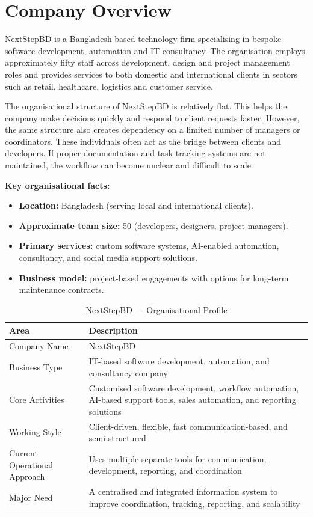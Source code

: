 \documentclass[12pt,a4paper]{report}
\begin{document}
\section{Company Overview}
NextStepBD is a Bangladesh-based technology firm specialising in bespoke software development, automation and IT consultancy. The organisation employs approximately fifty staff across development, design and project management roles and provides services to both domestic and international clients in sectors such as retail, healthcare, logistics and customer service.

The organisational structure of NextStepBD is relatively flat. This helps the company make decisions quickly and respond to client requests faster. However, the same structure also creates dependency on a limited number of managers or coordinators. These individuals often act as the bridge between clients and developers. If proper documentation and task tracking systems are not maintained, the workflow can become unclear and difficult to scale.

\textbf{Key organisational facts:}

\begin{itemize}[leftmargin=2em]
    \item \textbf{Location:} Bangladesh (serving local and international clients).
    \item \textbf{Approximate team size:} 50 (developers, designers, project managers).
    \item \textbf{Primary services:} custom software systems, AI-enabled automation, consultancy, and social media support solutions.
    \item \textbf{Business model:} project-based engagements with options for long-term maintenance contracts.
\end{itemize}

\begin{table}[H]
\centering
\renewcommand{\arraystretch}{1.3}
\begin{tabularx}{\textwidth}{|p{4cm}|X|}
\hline
\rowcolor{secondary}
\textbf{Area} & \textbf{Description} \\
\hline
Company Name & NextStepBD \\
\hline
Business Type & IT-based software development, automation, and consultancy company \\
\hline
Core Activities & Customised software development, workflow automation, AI-based support tools, sales automation, and reporting solutions \\
\hline
Working Style & Client-driven, flexible, fast communication-based, and semi-structured \\
\hline
Current Operational Approach & Uses multiple separate tools for communication, development, reporting, and coordination \\
\hline
Major Need & A centralised and integrated information system to improve coordination, tracking, reporting, and scalability \\
\hline
\end{tabularx}
\caption{NextStepBD --- Organisational Profile}
\end{table}
\end{document}
